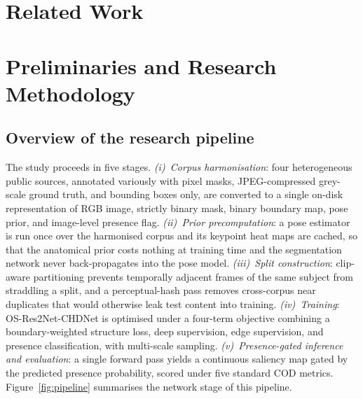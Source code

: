 \documentclass[3p,times,procedia]{elsarticle}
\begin{document}
\section{Related Work}
\label{sec:related}


\section{Preliminaries and Research Methodology}
\label{sec:method}

\subsection{Overview of the research pipeline}

The study proceeds in five stages. \emph{(i)~Corpus harmonisation}: four heterogeneous public sources, annotated variously with pixel masks, JPEG-compressed grey-scale ground truth, and bounding boxes only, are converted to a single on-disk representation of RGB image, strictly binary mask, binary boundary map, pose prior, and image-level presence flag. \emph{(ii)~Prior precomputation}: a pose estimator is run once over the harmonised corpus and its keypoint heat maps are cached, so that the anatomical prior costs nothing at training time and the segmentation network never back-propagates into the pose model. \emph{(iii)~Split construction}: clip-aware partitioning prevents temporally adjacent frames of the same subject from straddling a split, and a perceptual-hash pass removes cross-corpus near duplicates that would otherwise leak test content into training. \emph{(iv)~Training}: OS-Res2Net-CHDNet is optimised under a four-term objective combining a boundary-weighted structure loss, deep supervision, edge supervision, and presence classification, with multi-scale sampling. \emph{(v)~Presence-gated inference and evaluation}: a single forward pass yields a continuous saliency map gated by the predicted presence probability, scored under five standard COD metrics. Figure~\ref{fig:pipeline} summarises the network stage of this pipeline.
\end{document}
